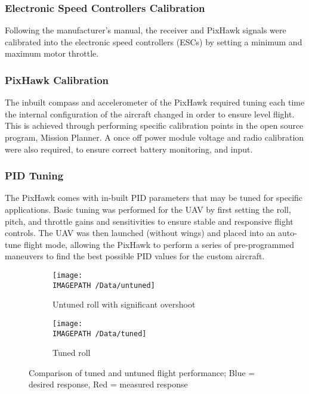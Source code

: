 \subsubsection*{Electronic Speed Controllers Calibration}
Following the manufacturer's manual, the receiver and PixHawk signals were calibrated into the electronic speed controllers (ESCs) by setting a minimum and maximum motor throttle.

\subsubsection*{PixHawk Calibration}
The inbuilt compass and accelerometer of the PixHawk required tuning each time the internal configuration of the aircraft changed in order to ensure level flight. This is achieved through performing specific calibration points in the open source program, Mission Planner. A once off power module voltage and radio calibration were also required, to ensure correct battery monitoring, and input. 

\subsubsection*{PID Tuning}
The PixHawk comes with in-built PID parameters that may be tuned for specific applications. Basic tuning was performed for the UAV by first setting the roll, pitch, and throttle gains and sensitivities to ensure stable and responsive flight controls. The UAV was then launched (without wings) and placed into an auto-tune flight mode, allowing the PixHawk to perform a series of pre-programmed maneuvers to find the best possible PID values for the custom aircraft.\\

\begin{figure}[!ht]
	\centering
	\begin{subfigure}{.5\textwidth}
		\texttt{[image: \\IMAGEPATH /Data/untuned]}
		\caption{Untuned roll with significant overshoot}
		\label{fig:untunedroll}
	\end{subfigure}%
	\begin{subfigure}{.5\textwidth}
		\centering
		\texttt{[image: \\IMAGEPATH /Data/tuned]}
		\caption{Tuned roll}
		\label{fig:tunedroll}
	\end{subfigure}
	\caption{Comparison of tuned and untuned flight performance; Blue = desired response, Red = measured response}
	\label{fig:tune1}
\end{figure}


